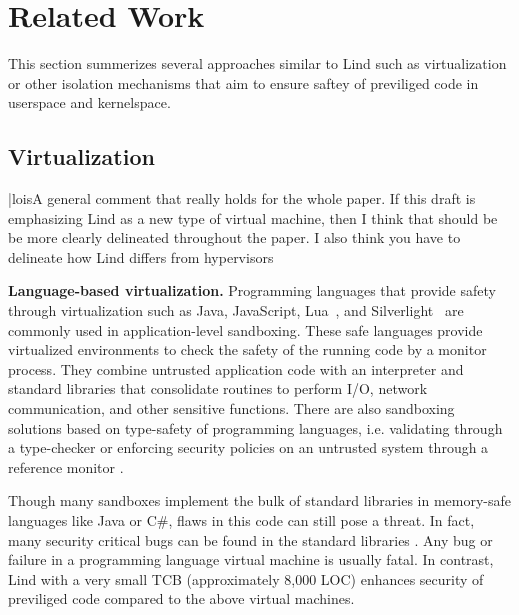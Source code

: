 \section{Related Work}
\label{sec.related_work}
This section summerizes several approaches similar to Lind such as virtualization or other isolation mechanisms that aim to ensure saftey of previliged code in userspace and kernelspace.


\subsection{Virtualization}
|lois{A general comment that really holds for the whole paper. If this draft is
 emphasizing Lind as a new type of virtual machine, then I think that should be
 be more clearly delineated throughout the paper. I also think you have to delineate how Lind differs from hypervisors}
 
\textbf{Language-based virtualization.}
Programming languages that provide safety through virtualization such
as Java, JavaScript, Lua~\cite{Lua}, and
Silverlight~\cite{Silverlight} are commonly used in application-level
sandboxing. These safe languages provide virtualized environments to
check the safety of the running code by a monitor process. They
combine untrusted application code with an interpreter and
standard libraries that consolidate routines to perform I/O, network
communication, and other sensitive functions.
%
There are also sandboxing solutions based on type-safety of programming
languages, i.e. validating through a type-checker \cite{JS-Sandboxing}
or enforcing security policies on an untrusted system through a
reference monitor \cite{JS-Sandboxing1}. %


Though many sandboxes implement the bulk of standard libraries in
memory-safe languages like Java or C\#, flaws in this code can
still pose a threat. In fact, many security critical bugs can be found
in the standard libraries \cite{JavaBugs, Java-Lessons}.
Any bug or failure in a programming language virtual
machine is usually fatal. In contrast, Lind with a very small TCB (approximately
8,000 LOC) enhances security of previliged code compared to the above virtual machines. 

